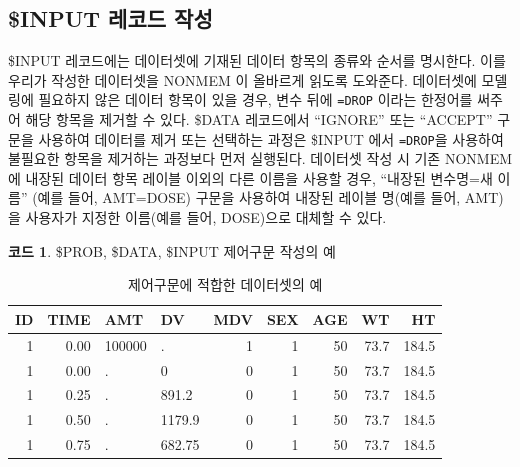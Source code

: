 \documentclass[
  11pt,
  krantz2,
  a4paper]{krantz}
\newenvironment{Shaded}{\begin{snugshade}}{\end{snugshade}}
\newcommand{\ErrorTok}[1]{\textcolor[rgb]{0.64,0.00,0.00}{\textbf{#1}}}
\newcommand{\NormalTok}[1]{#1}
\newcommand{\OperatorTok}[1]{\textcolor[rgb]{0.81,0.36,0.00}{\textbf{#1}}}
\theoremstyle{definition}
\theoremstyle{definition}
\newtheorem{example}{코드}[chapter]
\theoremstyle{definition}
\theoremstyle{remark}
\begin{document}
\hypertarget{input-uxb808uxcf54uxb4dc-uxc791uxc131}{%
\subsection{\$INPUT 레코드 작성}\label{input-uxb808uxcf54uxb4dc-uxc791uxc131}}


\$INPUT 레코드에는 데이터셋에 기재된 데이터 항목의 종류와 순서를 명시한다. 이를 우리가 작성한 데이터셋을 NONMEM 이 올바르게 읽도록 도와준다. 데이터셋에 모델링에 필요하지 않은 데이터 항목이 있을 경우, 변수 뒤에 \texttt{=DROP} 이라는 한정어를 써주어 해당 항목을 제거할 수 있다. \$DATA 레코드에서 ``IGNORE'' 또는 ``ACCEPT'' 구문을 사용하여 데이터를 제거 또는 선택하는 과정은 \$INPUT 에서 \texttt{=DROP}을 사용하여 불필요한 항목을 제거하는 과정보다 먼저 실행된다. 데이터셋 작성 시 기존 NONMEM에 내장된 데이터 항목 레이블 이외의 다른 이름을 사용할 경우, ``내장된 변수명=새 이름'' (예를 들어, AMT=DOSE) 구문을 사용하여 내장된 레이블 명(예를 들어, AMT)을 사용자가 지정한 이름(예를 들어, DOSE)으로 대체할 수 있다.

\begin{example}
\protect\hypertarget{exm:input}{}{\label{exm:input} }\$PROB, \$DATA, \$INPUT 제어구문 작성의 예
\end{example}

\begin{Shaded}
\end{Shaded}

\begin{table}

\caption{\label{tab:tab}제어구문에 적합한 데이터셋의 예}
\centering
\begin{tabular}[t]{rrllrrrrr}
\toprule
ID & TIME & AMT & DV & MDV & SEX & AGE & WT & HT\\
\midrule
1 & 0.00 & 100000 & . & 1 & 1 & 50 & 73.7 & 184.5\\
1 & 0.00 & . & 0 & 0 & 1 & 50 & 73.7 & 184.5\\
1 & 0.25 & . & 891.2 & 0 & 1 & 50 & 73.7 & 184.5\\
1 & 0.50 & . & 1179.9 & 0 & 1 & 50 & 73.7 & 184.5\\
1 & 0.75 & . & 682.75 & 0 & 1 & 50 & 73.7 & 184.5\\
\bottomrule
\end{tabular}
\end{table}
\end{document}
